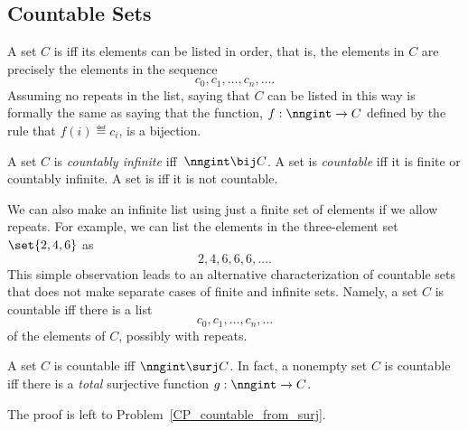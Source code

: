 \subsection{Countable Sets}\label{countable_subsec}
A set $C$ is  iff its elements can be listed in
order, that is, the elements in $C$ are precisely the elements in the
sequence
\[
c_0, c_1, \dots, c_n, \dots.
\]
Assuming no repeats in the list, saying that $C$ can be listed in this
way is formally the same as saying that the function, $f:\nngint \to
C$ defined by the rule that $f(i) \eqdef c_i$, is a bijection.

\begin{definition}\label{def_countable}
A set $C$ is \emph{countably infinite}%
 iff\  $\nngint \bij C$.  A
set is \emph{countable} iff it is finite or countably infinite.
A set is  iff it is not countable.
\end{definition}

We can also make an infinite list using just a finite set of elements
if we allow repeats.  For example, we can list the elements in the
three-element set $\set{2, 4, 6}$ as
\[
2,4,6,6,6,\dots.
\]
This simple observation leads to an alternative characterization of
countable sets that does not make separate cases of finite and
infinite sets.  Namely, a set $C$ is countable iff there is a list
\[
c_0, c_1, \dots, c_n, \dots
\]
of the elements of $C$, possibly with repeats.

\begin{lemma}\label{NsurjC}
A set $C$ is countable iff $\nngint \surj C$.  In fact, a nonempty
set $C$ is countable iff there is a \emph{total} surjective function
$g:\nngint \to C$.
\end{lemma}
The proof is left to Problem~\ref{CP_countable_from_surj}.

